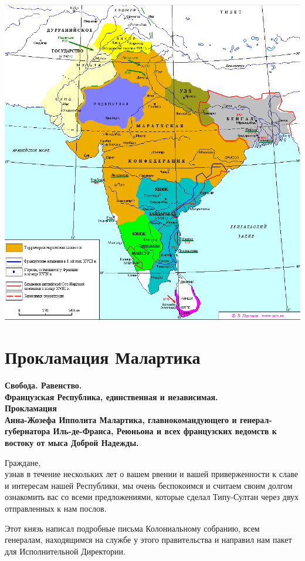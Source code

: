 \documentclass[
  oneside,
  12pt,
  titlepage]{book}
\begin{document}
\includegraphics{IndiaMap.png}

\hypertarget{ux43fux440ux43eux43aux43bux430ux43cux430ux446ux438ux44f-ux43cux430ux43bux430ux440ux442ux438ux43aux430}{%
\chapter{Прокламация Малартика}\label{ux43fux440ux43eux43aux43bux430ux43cux430ux446ux438ux44f-ux43cux430ux43bux430ux440ux442ux438ux43aux430}}

\textbf{Свобода. Равенство.\\
Французская Республика, единственная и независимая.\\
Прокламация\\
Анна-Жозефа Ипполита Малартика, главнокомандующего и генерал-губернатора Иль-де-Франса, Реюньона и всех французских ведомств к востоку от мыса Доброй Надежды.}

Граждане,\\
узнав в течение нескольких лет о вашем рвении и вашей приверженности к славе и интересам нашей Республики, мы очень беспокоимся и считаем своим долгом ознакомить вас со всеми предложениями, которые сделал Типу-Султан через двух отправленных к нам послов.

Этот князь написал подробные письма Колониальному собранию, всем генералам, находящимся на службе у этого правительства и направил нам пакет для Исполнительной Директории.
\end{document}
